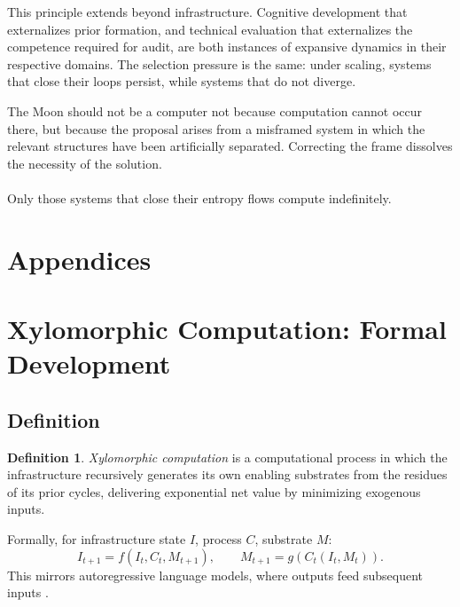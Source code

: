 \documentclass[11pt,a4paper]{article}
\theoremstyle{plain}
\theoremstyle{definition}
\newtheorem{definition}[theorem]{Definition}
\theoremstyle{remark}
\begin{document}
This principle extends beyond infrastructure. Cognitive development that
externalizes prior formation, and technical evaluation that externalizes the
competence required for audit, are both instances of expansive dynamics in their
respective domains. The selection pressure is the same: under scaling, systems
that close their loops persist, while systems that do not diverge.

The Moon should not be a computer not because computation cannot occur there, but
because the proposal arises from a misframed system in which the relevant
structures have been artificially separated. Correcting the frame dissolves the
necessity of the solution.

\paragraph{}
Only those systems that close their entropy flows compute indefinitely.

\newpage
\section*{Appendices}

\appendix

\section{Xylomorphic Computation: Formal Development}
\label{app:xylomorphic}

\subsection{Definition}

\begin{definition}
\emph{Xylomorphic computation} is a computational process in which the
infrastructure recursively generates its own enabling substrates from the
residues of its prior cycles, delivering exponential net value by minimizing
exogenous inputs.
\end{definition}

Formally, for infrastructure state $I$, process $C$, substrate $M$:
\[
  I_{t+1} = f(I_t, C_t, M_{t+1}),
  \qquad
  M_{t+1} = g(C_t(I_t, M_t)).
\]
This mirrors autoregressive language models, where outputs feed subsequent
inputs \citep{goodfellow2016}.
\end{document}
